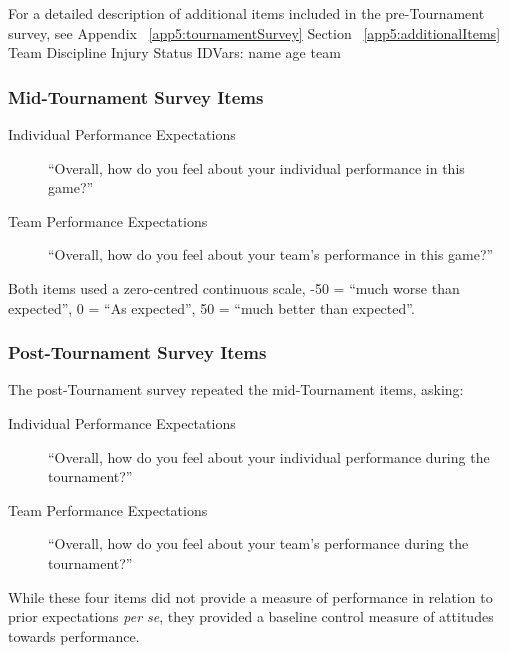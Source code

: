 
For a detailed description of additional items included in the pre-Tournament survey, see Appendix ~\ref{app5:tournamentSurvey} Section ~\ref{app5:additionalItems}
Team Discipline
Injury Status
IDVars: name age team








\subsubsection{Mid-Tournament Survey Items}


\begin{description}
\item [Individual Performance Expectations]``Overall, how do you feel about your individual performance in this game?''
\item [Team Performance Expectations] ``Overall, how do you feel about your team's performance in this game?''
\end{description}
Both items used a zero-centred continuous scale, -50 = ``much worse than expected'', 0 =  ``As expected'', 50 =  ``much better than expected''.








\subsubsection{Post-Tournament Survey Items}

The post-Tournament survey repeated the mid-Tournament items, asking:
\begin{description}
\item [Individual Performance Expectations] ``Overall, how do you feel about your individual performance during the tournament?''
\item [Team Performance Expectations]``Overall, how do you feel about your team's performance during the tournament?''
\end{description}


While these four items did not provide a measure of performance in relation to prior expectations \textit{per se}, they provided a baseline control measure of attitudes towards performance.


